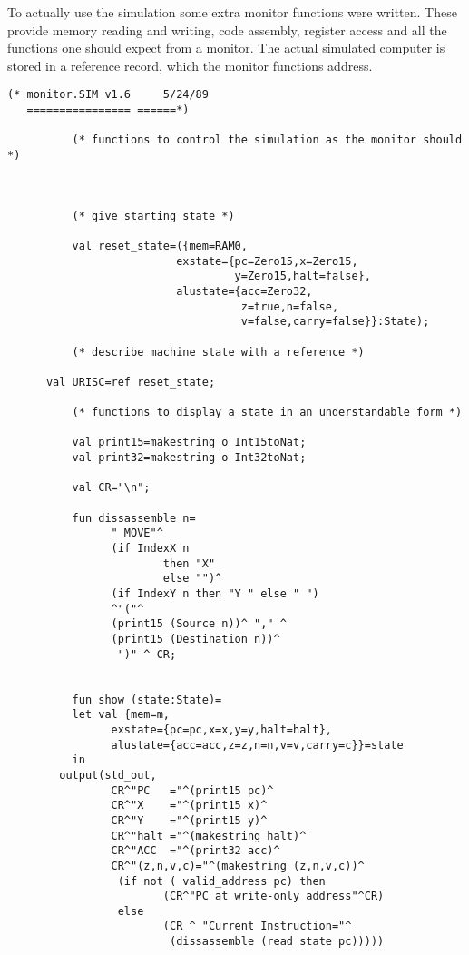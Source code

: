 To actually use the simulation some extra monitor functions were written.
These provide memory reading and writing, code assembly, register access and all the functions one should expect from a monitor.
The actual simulated computer is stored in a reference record,
which the monitor functions address.
\begin{verbatim}
(* monitor.SIM v1.6 	5/24/89 
   ================	======*)
 
          (* functions to control the simulation as the monitor should *) 
           
          
           
          (* give starting state *)
 
          val reset_state=({mem=RAM0, 
                          exstate={pc=Zero15,x=Zero15,
                                   y=Zero15,halt=false},                  
                          alustate={acc=Zero32,
                                    z=true,n=false,
                                    v=false,carry=false}}:State);
 
          (* describe machine state with a reference *) 
 
	  val URISC=ref reset_state;
           
          (* functions to display a state in an understandable form *) 
           
          val print15=makestring o Int15toNat; 
          val print32=makestring o Int32toNat; 
           
          val CR="\n"; 
           
          fun dissassemble n= 
                " MOVE"^ 
                (if IndexX n 
                        then "X" 
                        else "")^ 
                (if IndexY n then "Y " else " ")
                ^"("^
                (print15 (Source n))^ "," ^
                (print15 (Destination n))^
                 ")" ^ CR; 
           
           
          fun show (state:State)= 
          let val {mem=m, 
                exstate={pc=pc,x=x,y=y,halt=halt}, 
                alustate={acc=acc,z=z,n=n,v=v,carry=c}}=state 
          in 
		output(std_out,
                CR^"PC   ="^(print15 pc)^ 
                CR^"X    ="^(print15 x)^
                CR^"Y    ="^(print15 y)^ 
                CR^"halt ="^(makestring halt)^ 
                CR^"ACC  ="^(print32 acc)^ 
                CR^"(z,n,v,c)="^(makestring (z,n,v,c))^ 
                 (if not ( valid_address pc) then 
                        (CR^"PC at write-only address"^CR) 
                 else 
                        (CR ^ "Current Instruction="^ 
                         (dissassemble (read state pc)))))
		  

\end{verbatim}
